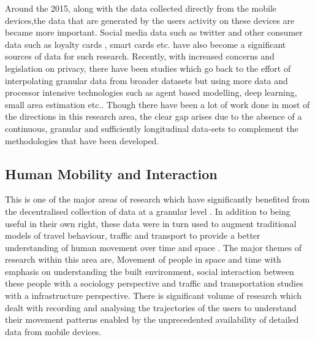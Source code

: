 Around the 2015, along with the data collected directly from the mobile devices,the data that are generated by the users activity on these devices are became more important.
Social media data such as twitter \citep{lansley2016} and other consumer data such as loyalty cards \citep{lloyd2018}, smart cards \citep{ordonez2012} etc. have also become a significant sources of data for such research.
Recently, with increased concerns and legislation on privacy, there have been studies which go back to the effort of interpolating granular data from broader datasets but using more data and processor intensive technologies such as agent based modelling, deep learning, small area estimation \citep{crols2019, shibata2019, rao2015} etc..
Though there have been a lot of work done in most of the directions in this research area, the clear gap arises due to the absence of a continuous, granular and sufficiently longitudinal data-sets to complement the methodologies that have been developed. 


\subsection{Human Mobility and Interaction}

This is one of the major areas of research which have significantly benefited from the decentralised collection of data at a granular level \cite{castells2000}.
In addition to being useful in their own right, these data were in turn used to augment traditional models of travel behaviour, traffic and transport to provide a better understanding of human movement over time and space \citep{janssens2013}.
The major themes of research within this area are, Movement of people in space and time with emphasis on understanding the built environment, social interaction between these people with a sociology perspective and traffic and transportation studies with a infrastructure perspective.
There is significant volume of research which dealt with recording and analysing the trajectories of the users to understand their movement patterns enabled by the unprecedented availability of detailed data from mobile devices.


